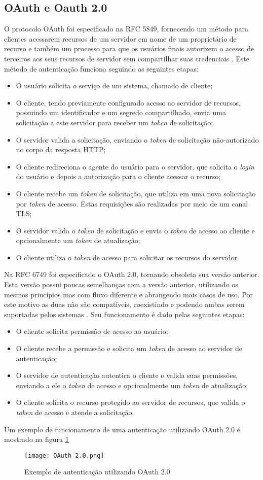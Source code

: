 \subsection{OAuth e Oauth 2.0}

O protocolo OAuth foi especificado na RFC 5849, fornecendo um método para clientes acessarem recursos de um servidor em nome de um proprietário de recurso e também um processo para que os usuários finais autorizem o acesso de terceiros aos seus recursos de servidor sem compartilhar suas
credenciais \cite{RFC5849}. Este método de autenticação funciona seguindo as seguintes etapas:

\begin{itemize}
\item O usuário solicita o serviço de um sistema, chamado de cliente;
\item O cliente, tendo previamente configurado acesso ao servidor de recursos, possuindo um identificador e um segredo compartilhado, envia uma solicitação a este servidor para receber um \emph{token} de solicitação;
\item O servidor valida a solicitação, enviando o \emph{token} de solicitação não-autorizado no corpo da resposta HTTP;
\item O cliente redireciona o agente do usuário para o servidor, que solicita o \emph{login} do usuário e depois a autorização para o cliente acessar o recurso;
\item O cliente recebe um \emph{token} de solicitação, que utiliza em uma nova solicitação por \emph{token} de acesso. Estas requisições são realizadas por meio de um canal TLS;
\item O servidor valida o \emph{token} de solicitação e envia o \emph{token} de acesso ao cliente e opcionalmente um \emph{token} de atualização;
\item O cliente utiliza o \emph{token} de acesso para solicitar os recursos do servidor.
\end{itemize}

Na RFC 6749 foi especificado o OAuth 2.0, tornando obsoleta sua versão anterior. Esta versão possui poucas semelhanças com a versão anterior, utilizando os mesmos princípios mas com fluxo diferente e abrangendo mais casos de uso. Por este motivo as duas não são compatíveis, coexistindo e podendo ambas serem suportadas pelos sistemas \cite{RFC6749}. Seu funcionamento é dado pelas seguintes etapas:

\begin{itemize}
\item O cliente solicita permissão de acesso ao usuário;
\item O cliente recebe a permissão e solicita um \emph{token} de acesso ao servidor de autenticação;
\item O servidor de autenticação autentica o cliente e valida suas permissões, enviando a ele o \emph{token} de acesso e opcionalmente um \emph{token} de atualização;
\item O cliente solicita o recurso protegido ao servidor de recursos, que valida o \emph{token} de acesso e atende a solicitação.
\end{itemize}

Um exemplo de funcionamento de uma autenticação utilizando OAuth 2.0 é mostrado na figura \ref{fig:OAuth2}

\begin{figure}[ht]
    \centering
    \texttt{[image: OAuth 2.0.png]}
    \caption{Exemplo de autenticação utilizando OAuth 2.0}
    \label{fig:OAuth2}
\end{figure}